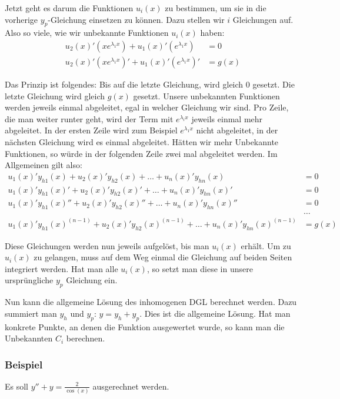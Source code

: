 Jetzt geht es darum die Funktionen $u_i(x)$ zu bestimmen, um sie in die vorherige
$y_p$-Gleichung einsetzen zu können. Dazu stellen wir $i$ Gleichungen auf.
Also so viele, wie wir unbekannte Funktionen $u_i(x)$ haben:
\begin{align*}
u_2(x)' (x e^{\lambda_1 x}) + u_1(x)' (e^{\lambda_1 x}) &= 0\\
u_2(x)' (x e^{\lambda_1 x})' + u_1(x)' (e^{\lambda_1 x})' &= g(x)
\end{align*}

Das Prinzip ist folgendes: Bis auf die letzte Gleichung, wird gleich $0$ gesetzt.
Die letzte Gleichung wird gleich $g(x)$ gesetzt.
Unsere unbekannten Funktionen werden jeweils einmal abgeleitet, egal in welcher
Gleichung wir sind. Pro Zeile, die man weiter runter geht, wird der Term mit $e^{\lambda_i x}$
jeweils einmal mehr abgeleitet. In der ersten Zeile wird zum Beispiel $e^{\lambda_1 x}$ nicht abgeleitet,
in der nächsten Gleichung wird es einmal abgeleitet. Hätten wir mehr Unbekannte Funktionen,
so würde in der folgenden Zeile zwei mal abgeleitet werden. Im Allgemeinen gilt also:
{\footnotesize
\begin{align*}
u_1(x)' y_{h1}(x) + u_2(x)' y_{h2}(x) + \ldots + u_n(x)' y_{hn}(x) &= 0\\
u_1(x)' y_{h1}(x)' + u_2(x)' y_{h2}(x)' + \ldots + u_n(x)' y_{hn}(x)' &= 0\\
u_1(x)' y_{h1}(x)'' + u_2(x)' y_{h2}(x)'' + \ldots + u_n(x)' y_{hn}(x)'' &= 0\\
&\ldots\\
u_1(x)' y_{h1}(x)^{(n-1)} + u_2(x)' y_{h2}(x)^{(n-1)} + \ldots + u_n(x)' y_{hn}(x)^{(n-1)} &= g(x)
\end{align*}
}

Diese Gleichungen werden nun jeweils aufgelöst, bis man $u_i(x)$ erhält. Um zu
$u_i(x)$ zu gelangen, muss auf dem Weg einmal die Gleichung auf beiden Seiten
integriert werden. Hat man alle $u_i(x)$, so setzt man diese in unsere
ursprüngliche $y_p$ Gleichung ein.

Nun kann die allgemeine Lösung des inhomogenen DGL berechnet werden. Dazu
summiert man $y_h$ und $y_p$: $y = y_h + y_p$. Dies ist die allgemeine Lösung.
Hat man konkrete Punkte, an denen die Funktion ausgewertet wurde, so kann man
die Unbekannten $C_i$ berechnen.

\subsubsection{Beispiel}
Es soll $y'' + y = \frac{2}{\cos(x)}$ ausgerechnet werden.

